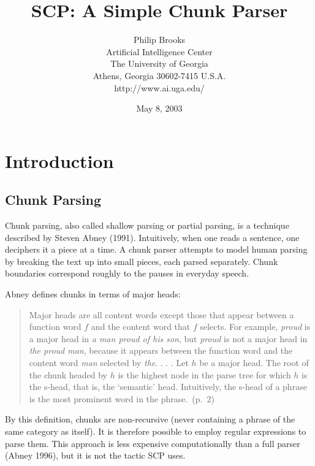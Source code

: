 \documentclass[12pt]{article}
\title{SCP: A Simple Chunk Parser}
\author{Philip Brooks \\
Artificial Intelligence Center \\
The University of Georgia \\
Athens, Georgia 30602-7415 U.S.A.\\
http://www.ai.uga.edu/}
\date{May 8, 2003}
\begin{document}
\maketitle

\section{Introduction}

\subsection{Chunk Parsing}

Chunk parsing, also called shallow parsing or partial parsing, is a technique described by Steven Abney (1991). Intuitively, when one reads a sentence, one deciphers it a piece at a time.  A chunk parser attempts to model human parsing by breaking the text up into small pieces, each parsed separately.  Chunk boundaries correspond roughly to the pauses in everyday speech.

Abney defines chunks in terms of major heads: 
\begin{quotation}
Major heads are all content words except those that appear between a function word $f$ and the content word that $f$ selects.  For example, \emph{proud} is a major head in \emph{a man proud of his son}, but \emph{proud} is not a major head in \emph{the proud man}, because it appears between the function word and the content word \emph{man} selected by \emph{the}. . . . Let $h$ be a major head.  The root of the chunk headed by $h$ is the highest node in the parse tree for which $h$ is the s-head, that is, the `semantic' head.  Intuitively, the s-head of a phrase is the most prominent word in the phrase.\ (p.~2)
\end{quotation}
By this definition, chunks are non-recursive (never containing a phrase of the same category as itself).  It is therefore possible to employ regular expressions to parse them.  This approach is less expensive computationally than a full parser (Abney 1996), but it is not the tactic SCP uses.
\end{document}
